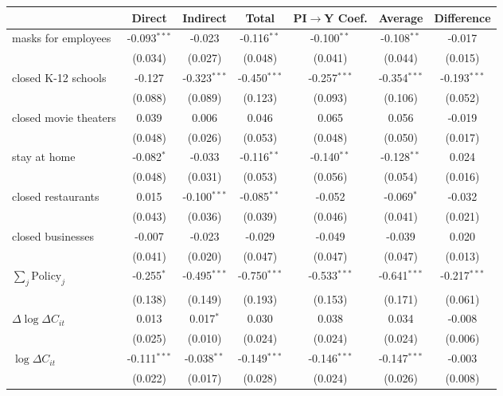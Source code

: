 
\begin{tabular}{lccccc|>{}c}
\toprule
  & Direct & Indirect & Total & PI$\to$Y Coef. & Average & Difference\\
\midrule
masks for employees & -0.093$^{***}$ & -0.023 & -0.116$^{**}$ & -0.100$^{**}$ & -0.108$^{**}$ & -0.017\\
 & (0.034) & (0.027) & (0.048) & (0.041) & (0.044) & (0.015)\\
closed K-12 schools & -0.127 & -0.323$^{***}$ & -0.450$^{***}$ & -0.257$^{***}$ & -0.354$^{***}$ & -0.193$^{***}$\\
 & (0.088) & (0.089) & (0.123) & (0.093) & (0.106) & (0.052)\\
closed movie theaters & 0.039 & 0.006 & 0.046 & 0.065 & 0.056 & -0.019\\
 & (0.048) & (0.026) & (0.053) & (0.048) & (0.050) & (0.017)\\
stay at home & -0.082$^{*}$ & -0.033 & -0.116$^{**}$ & -0.140$^{**}$ & -0.128$^{**}$ & 0.024\\
 & (0.048) & (0.031) & (0.053) & (0.056) & (0.054) & (0.016)\\
closed restaurants & 0.015 & -0.100$^{***}$ & -0.085$^{**}$ & -0.052 & -0.069$^{*}$ & -0.032\\
 & (0.043) & (0.036) & (0.039) & (0.046) & (0.041) & (0.021)\\
closed businesses & -0.007 & -0.023 & -0.029 & -0.049 & -0.039 & 0.020\\
 & (0.041) & (0.020) & (0.047) & (0.047) & (0.047) & (0.013)\\
$\sum_j \mathrm{Policy}_j$ & -0.255$^{*}$ & -0.495$^{***}$ & -0.750$^{***}$ & -0.533$^{***}$ & -0.641$^{***}$ & -0.217$^{***}$\\
 & (0.138) & (0.149) & (0.193) & (0.153) & (0.171) & (0.061)\\
$\Delta \log \Delta C_{it}$ & 0.013 & 0.017$^{*}$ & 0.030 & 0.038 & 0.034 & -0.008\\
 & (0.025) & (0.010) & (0.024) & (0.024) & (0.024) & (0.006)\\
$\log \Delta C_{it}$ & -0.111$^{***}$ & -0.038$^{**}$ & -0.149$^{***}$ & -0.146$^{***}$ & -0.147$^{***}$ & -0.003\\
 & (0.022) & (0.017) & (0.028) & (0.024) & (0.026) & (0.008)\\
\bottomrule
\end{tabular}